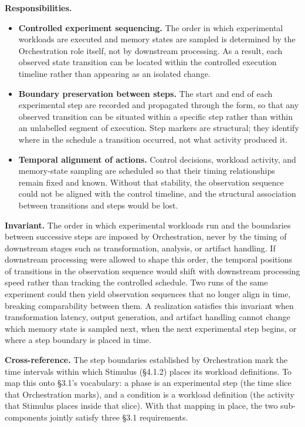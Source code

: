   \textbf{Responsibilities.}
  \begin{itemize}
    \item \textbf{Controlled experiment sequencing.} The order in which experimental workloads are executed and memory states are sampled is determined by the Orchestration role itself, not by downstream processing. As a result, each observed state transition can be located within the controlled execution timeline rather than appearing as an isolated change.
    \item \textbf{Boundary preservation between steps.} The start and end of each experimental step are recorded and propagated through the form, so that any observed transition can be situated within a specific step rather than within an unlabelled segment of execution. Step markers are structural; they identify where in the schedule a transition occurred, not what activity produced it.
    \item \textbf{Temporal alignment of actions.} Control decisions, workload activity, and memory-state sampling are scheduled so that their timing relationships remain fixed and known. Without that stability, the observation sequence could not be aligned with the control timeline, and the structural association between transitions and steps would be lost.
  \end{itemize}

  \textbf{Invariant.} The order in which experimental workloads run and the boundaries between successive steps are imposed by Orchestration, never by the timing of downstream stages such as transformation, analysis, or artifact handling. If downstream processing were allowed to shape this order, the temporal positions of transitions in the observation sequence would shift with downstream processing speed rather than tracking the controlled schedule. Two runs of the same experiment could then yield observation sequences that no longer align in time, breaking comparability between them. A realization satisfies this invariant when transformation latency, output generation, and artifact handling cannot change which memory state is sampled next, when the next experimental step begins, or where a step boundary is placed in time.

  \textbf{Cross-reference.} The step boundaries established by Orchestration mark the time intervals within which Stimulus (\S4.1.2) places its workload definitions. To map this onto \S3.1's vocabulary: a phase is an experimental step (the time slice that Orchestration marks), and a condition is a workload definition (the activity that Stimulus places inside that slice). With that mapping in place, the two sub-components jointly satisfy three \S3.1 requirements.

